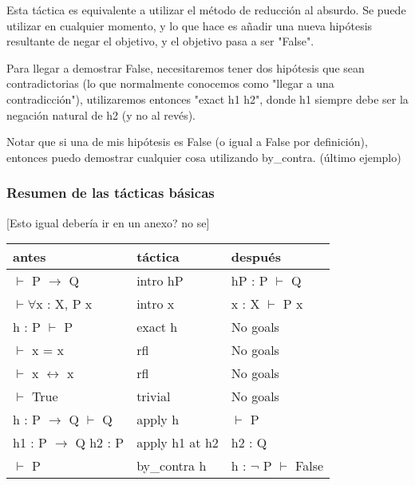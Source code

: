 \documentclass{article}
\begin{document}
Esta táctica es equivalente a utilizar el método de reducción al absurdo. Se puede utilizar en cualquier momento, y lo que hace es añadir una nueva hipótesis resultante de negar el objetivo, y el objetivo pasa a ser "False".

Para llegar a demostrar False, necesitaremos tener dos hipótesis que sean contradictorias (lo que normalmente conocemos como "llegar a una contradicción"), utilizaremos entonces "exact h1 h2", donde h1 siempre debe ser la negación natural de h2 (y no al revés).


Notar que si una de mis hipótesis es False (o igual a False por definición), entonces puedo demostrar cualquier cosa utilizando by\_contra. (último ejemplo)

\subsubsection{Resumen de las tácticas básicas}


[Esto igual debería ir en un anexo? no se]

\renewcommand{\arraystretch}{2}

\begin{center}
\begin{tabular}{|  m{8em}  |m{8em} |m{8em}  |} 
  \hline
  \textbf{antes} & \textbf{táctica} & \textbf{después} \\
  \hline
  $\vdash$ P $\rightarrow$ Q & intro hP & \parbox{8em}{hP : P \\ $\vdash$ Q} \\ 
  \hline
  $\vdash \forall$x : X, P x & intro x &  \parbox{8em}{x : X \\ $\vdash$ P x} \\ 
  \hline
  \parbox{8em}{h : P \\ $\vdash$ P}& exact h & No goals\\ 
  \hline
  $\vdash$ x = x & rfl & No goals\\ 
  \hline
  $\vdash$ x $\leftrightarrow$ x & rfl & No goals\\ 
  \hline
  $\vdash$ True & trivial & No goals \\ 
  \hline
  \parbox{8em}{h : P $\rightarrow$ Q \\ $\vdash$ Q} & apply h & $\vdash$ P\\ 
  \hline
  \parbox{8em}{h1 : P $\rightarrow$ Q \\ h2 : P} & apply h1 at h2 & h2 : Q\\ 
  \hline
  $\vdash$ P & by\_contra h & \parbox{8em}{h : $\neg$ P \\ $\vdash$ False} \\\hline
\end{tabular}
\end{center}
\end{document}
